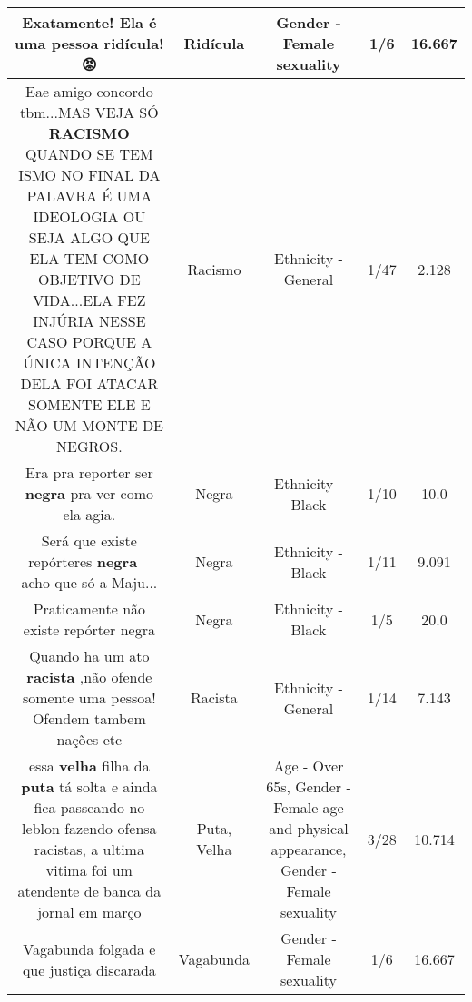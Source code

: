 \documentclass[11pt]{article}
\newlength\mylength
\begin{document}
\begin{center}
\begin{longtable}{|C{.65\mylength}|C{.30\mylength}|C{.12\mylength}|C{.12\mylength}|C{.12\mylength}|}
  \small Exatamente! Ela é uma pessoa \textbf{ridícula}!😡\normalsize   & Ridícula & Gender - Female sexuality & 1/6 & 16.667 \\  \hline
  \small Eae amigo concordo tbm...MAS VEJA SÓ \textbf{RACISMO}  QUANDO SE TEM ISMO NO FINAL DA PALAVRA É UMA IDEOLOGIA OU SEJA ALGO QUE ELA  TEM COMO OBJETIVO  DE VIDA...ELA FEZ INJÚRIA NESSE CASO  PORQUE A ÚNICA INTENÇÃO DELA FOI  ATACAR SOMENTE ELE E NÃO UM MONTE  DE NEGROS.\normalsize   & Racismo & Ethnicity - General & 1/47 & 2.128 \\  \hline
  \small Era pra reporter ser \textbf{negra} pra ver como ela agia.\normalsize   & Negra & Ethnicity - Black & 1/10 & 10.0 \\  \hline
  \small Será que existe repórteres \textbf{negra} 🤔🤔 acho que só a Maju...\normalsize   & Negra & Ethnicity - Black & 1/11 & 9.091 \\  \hline
  \small Praticamente não existe repórter negra\normalsize   & Negra & Ethnicity - Black & 1/5 & 20.0 \\  \hline
  \small Quando ha   um ato \textbf{racista} ,não  ofende somente uma  pessoa! Ofendem tambem nações etc\normalsize   & Racista & Ethnicity - General & 1/14 & 7.143 \\  \hline
  \small essa \textbf{v\textbf{elha}} filha da \textbf{puta} tá solta e ainda fica passeando no leblon fazendo ofensa racistas, a ultima vitima foi um atendente de banca da jornal em março\normalsize   & Puta, Velha & Age - Over 65s, Gender - Female age and physical appearance, Gender - Female sexuality & 3/28 & 10.714 \\  \hline
  \small Vagabunda folgada e que justiça discarada\normalsize   & Vagabunda & Gender - Female sexuality & 1/6 & 16.667 \\  \hline

\end{longtable}
\end{center}
\end{document}
